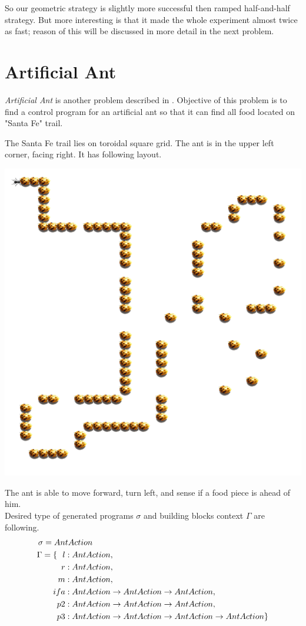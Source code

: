 \documentclass[12pt,a4paper]{report}
\begin{document}
So our geometric strategy is slightly more successful then 
ramped half-and-half strategy. But more interesting is that
it made the whole experiment almost twice as fast; 
reason of this will be discussed in more detail in the next problem. 

\newpage
\section{Artificial Ant}

\textit{Artificial Ant} is another problem described
in \cite{koza92}. Objective of this problem is to 
find a control program for an artificial ant so
that it can find all food located on "Santa Fe" trail.

The Santa Fe trail lies on toroidal square grid.
The ant is in the upper left corner, facing right.
It has following layout.

\includegraphics[scale=1]{santafe.png}



The ant is able to move forward, turn left, and sense if a food 
piece is ahead of him.\\

Desired type of generated programs $\sigma$ and 
building blocks context $\Gamma$ are following.
\begin{align*}
\sigma = An&tAction\\
\Gamma = \{~~
  l    &: AntAction                              ,\\
  r    &: AntAction                              ,\\
  m    &: AntAction                              ,\\
  ifa  &: AntAction \rightarrow AntAction \rightarrow AntAction  ,\\
  p2   &: AntAction \rightarrow AntAction \rightarrow AntAction  ,\\
  p3   &: AntAction \rightarrow AntAction \rightarrow AntAction \rightarrow AntAction  \}
\end{align*}
\end{document}
